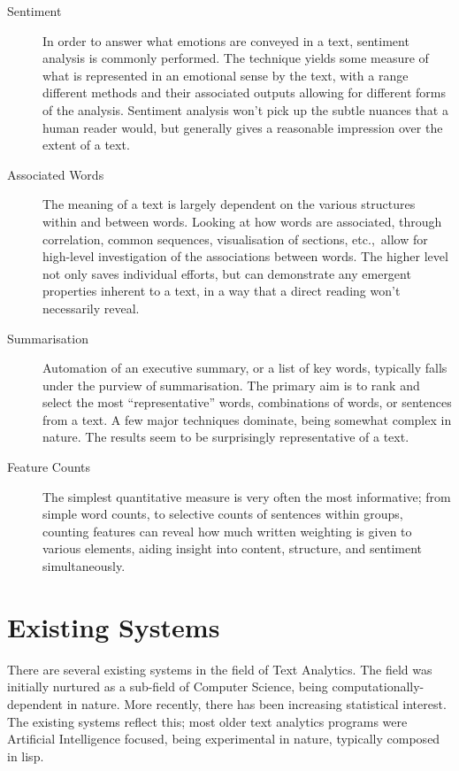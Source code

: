 \message{ !name(jason-cairns-dissertation.tex)}\documentclass[11pt, a4paper, titlepage]{report}
\begin{document}
\begin{description}
\item[Sentiment] In order to answer what emotions are conveyed in a
  text, sentiment analysis is commonly performed. The technique yields
  some measure of what is represented in an emotional sense by the
  text, with a range different methods and their associated outputs
  allowing for different forms of the analysis. Sentiment analysis
  won't pick up the subtle nuances that a human reader would, but
  generally gives a reasonable impression over the extent of a text.
\item[Associated Words] The meaning of a text is largely dependent on
  the various structures within and between words. Looking at how
  words are associated, through correlation, common sequences,
  visualisation of sections, etc.,\ allow for high-level investigation
  of the associations between words. The higher level not only saves
  individual efforts, but can demonstrate any emergent properties
  inherent to a text, in a way that a direct reading won't necessarily
  reveal.
\item[Summarisation] Automation of an executive summary, or a list of
  key words, typically falls under the purview of summarisation. The
  primary aim is to rank and select the most ``representative'' words,
  combinations of words, or sentences from a text. A few major
  techniques dominate, being somewhat complex in nature. The results
  seem to be surprisingly representative of a text.
\item[Feature Counts] The simplest quantitative measure is very often
  the most informative; from simple word counts, to selective counts
  of sentences within groups, counting features can reveal how much
  written weighting is given to various elements, aiding insight into
  content, structure, and sentiment simultaneously.
\end{description}

\section{Existing Systems}

There are several existing systems in the field of Text Analytics. The
field was initially nurtured as a sub-field of Computer Science, being
computationally-dependent in nature. More recently, there has been
increasing statistical interest. The existing systems reflect this;
most older text analytics programs were Artificial Intelligence
focused, being experimental in nature, typically composed in lisp.
\end{document}
